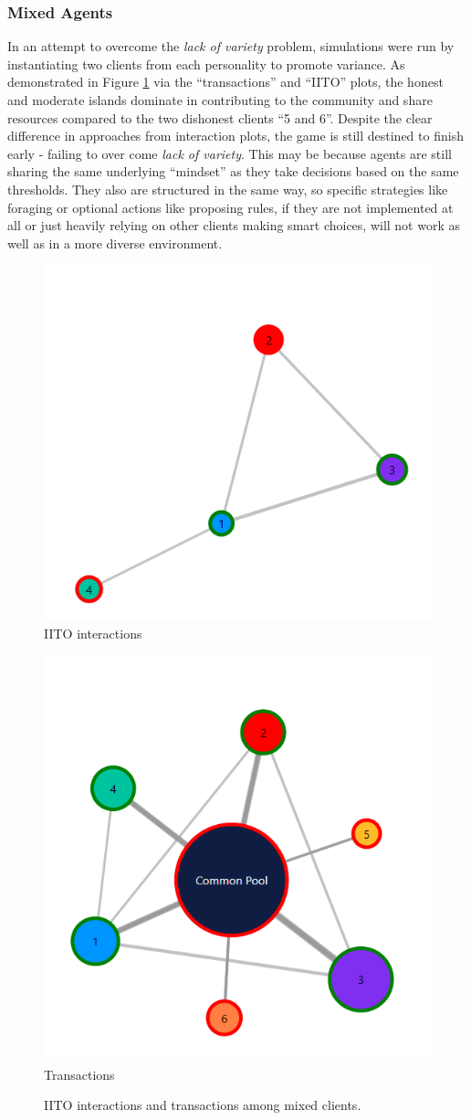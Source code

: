 \subsubsection{Mixed Agents}
In an attempt to overcome the \emph{lack of variety} problem, simulations were run by instantiating two clients from each personality to promote variance. As demonstrated in Figure \ref{fig:IITOTransMA} via the “transactions” and “IITO” plots, the honest and moderate islands dominate in contributing to the community and share resources compared to the two dishonest clients “5 and 6”. Despite the clear difference in approaches from interaction plots, the game is still destined to finish early - failing to over come \emph{lack of variety}. This may be because agents are still sharing the same underlying “mindset” as they take decisions based on the same thresholds. They also are structured in the same way, so specific strategies like foraging or optional actions like proposing rules, if they are not implemented at all or just heavily relying on other clients making smart choices, will not work as well as in a more diverse environment.

\begin{figure}[H]
\centering
\begin{minipage}{.5\textwidth}
  \centering
  \includegraphics[width=.45\linewidth]{12_team4_agentdesign/images/IITOMA.png}
  IITO interactions
\end{minipage}%
\begin{minipage}{.5\textwidth}
  \centering
  \includegraphics[width=.45\linewidth]{12_team4_agentdesign/images/TransactionsMA.png}
  Transactions
\end{minipage}
  \label{fig:IITOTransMA}
  \caption{IITO interactions and transactions among mixed clients.}
\end{figure}



